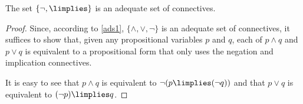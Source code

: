\begin{corollary}
The set $\{\lnot,\limplies\}$ is an adequate set of connectives.
\label{adequateni}
\end{corollary}

\begin{proof}
Since, according to \ref{ads1}, $\{\land,\lor,\lnot\}$ is an adequate set of connectives, it suffices to show that, given any propositional variables $p$ and $q$, each of $p\land q$ and $p\lor q$ is equivalent to a propositional form that only uses the negation and implication connectives.

It is easy to see that $p\land q$ is equivalent to $\lnot(p\limplies(\lnot q))$ and that $p\lor q$ is equivalent to $(\lnot p)\limplies q$.
\end{proof}

